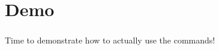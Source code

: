 \section{Demo}

\begin{frame}
    \frametitle{\secname}

    Time to demonstrate how to actually use the commands!
\end{frame}
